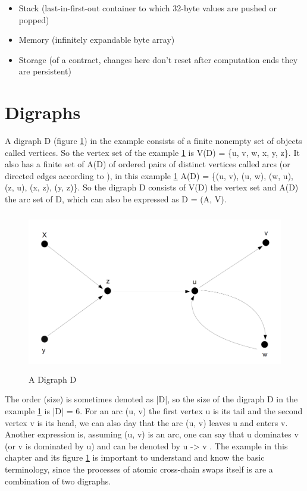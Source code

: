 \begin{itemize}
	\item Stack (last-in-first-out container to which 32-byte values are pushed or popped)
	\item Memory (infinitely expandable byte array)
	\item Storage (of a contract, changes here don't reset after computation ends they are persistent)
\end{itemize}


\clearpage


\section{Digraphs}
\label{sec:background:second_section}
A \ac{digraph} D (figure \ref{fig:a_digraph_d}) in the example consists of a finite nonempty set of objects called vertices. So the vertex set of the example \ref{fig:a_digraph_d} is V(D) = \{u, v, w, x, y, z\}. It also has a finite set of A(D) of ordered pairs of distinct vertices called arcs (or directed edges according to \cite{chartrand2010graphs}), in this example \ref{fig:a_digraph_d} A(D) = \{(u, v), (u, w), (w, u), (z, u), (x, z), (y, z)\}. So the \ac{digraph} D consists of V(D) the vertex set and A(D) the arc set of D, which can also be expressed as D = (A, V). \newline



\begin{figure}[h]
	\includegraphics[height=7cm]{adigraphd}	%
	\caption{A Digraph D}
	\label{fig:a_digraph_d}
\end{figure}


The order (size) is sometimes denoted as |D|, so the size of the \ac{digraph} D in the example \ref{fig:a_digraph_d} is |D| = 6. For an arc (u, v) the first vertex u is its tail and the second vertex v is its head, we can also day that the arc (u, v) leaves u and enters v. Another expression is, assuming (u, v) is an arc, one can say that u dominates v (or v is dominated by u) and can be denoted by u -> v \cite{bang2007theory}. The example in this chapter and its figure \ref{fig:a_digraph_d} is important to understand and know the basic terminology, since the processes of atomic cross-chain swaps itself is are a combination of two digraphs.


